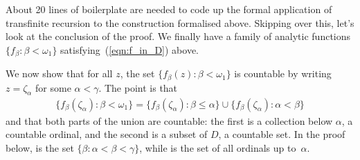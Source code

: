 \documentclass[runningheads]{llncs}
\begin{document}
About 20 lines of boilerplate are needed to code up the formal application of transfinite recursion to the construction formalised above. Skipping over this, let's look at the conclusion of the proof.
We finally have a family of analytic functions $\{f_\beta : \beta < \omega_1 \}$ satisfying~(\ref{eqn:f_in_D}) above. 

We now show that for all $z$, the set $\{f_\beta(z) : \beta < \omega_1 \}$ is countable by writing $z=\zeta_\alpha$ for some $\alpha<\gamma$.
The point is that 
\begin{align*}
\{f_\beta(\zeta_\alpha) : \beta < \omega_1 \} = \{f_\beta (\zeta_\alpha): \beta\le\alpha\} \cup \{f_\beta (\zeta_\alpha): \alpha<\beta\}
\end{align*}
and that both parts of the union are countable: the first is a collection below $\alpha$, a countable ordinal, and the second is a subset of $D$, a countable set.
In the proof below,  is the set $\{\beta: \alpha<\beta<\gamma\}$, while  is the set of all ordinals up to~$\alpha$. 
\end{document}
